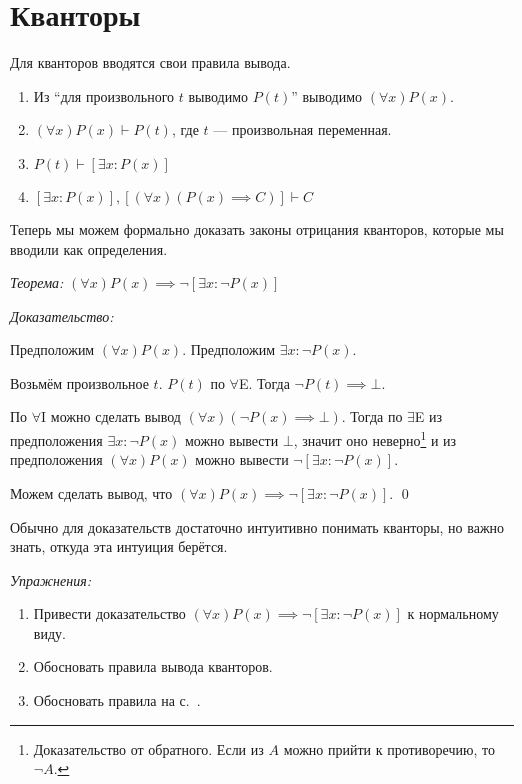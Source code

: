\section{Кванторы}

Для кванторов вводятся свои правила вывода.

\newcommand\Aii{$\forall$I}
\newcommand\Aee{$\forall$E}
\newcommand\Eii{$\exists$I}
\newcommand\Eee{$\exists$E}
\begin{enumerate}
	\item[(\Aii)]{}Из ``для произвольного $t$ выводимо $P(t)$''
	выводимо $(\forall x)P(x)$.
	\item[(\Aee)]{}$(\forall x)P(x)\vdash P(t)$, где $t$ --- произвольная переменная.
	\item[(\Eii)]{}$P(t)\vdash [\exists x:P(x)]$
	\item[(\Eee)]{}$[\exists x:P(x)], [(\forall x)(P(x)\implies C)]\vdash C$
\end{enumerate}

Теперь мы можем формально доказать законы отрицания кванторов,
которые мы вводили как определения.

\label{wordproof}
{\it Теорема:}
$(\forall x)P(x)\implies \lnot[\exists x:\lnot P(x)]$

{\it Доказательство:}

Предположим $(\forall x)P(x)$. Предположим $\exists x:\lnot P(x)$.

Возьмём произвольное $t$. $P(t)$ по \Aee. Тогда $\lnot P(t)\implies\bot$.

По \Aii{} можно сделать вывод $(\forall x)(\lnot P(x)\implies\bot)$.
Тогда по \Eee{} из предположения ${\exists x:\lnot P(x)}$ можно вывести $\bot$,
значит оно неверно\footnote{
	Доказательство от обратного. Если из $A$ можно прийти к противоречию, то $\lnot A$.
} и из предположения $(\forall x)P(x)$
можно вывести $\lnot[\exists x:\lnot P(x)]$.

Можем сделать вывод, что $(\forall x)P(x)\implies \lnot[\exists x:\lnot P(x)]$.
\qed

Обычно для доказательств достаточно интуитивно понимать кванторы,
но важно знать, откуда эта интуиция берётся.

{\it Упражнения:}

\begin{enumerate}
	\item{}Привести доказательство ${(\forall x)P(x)\implies \lnot[\exists x:\lnot P(x)]}$
	к нормальному виду.
	\item{}Обосновать правила вывода кванторов.
	\item{}Обосновать правила на с.~\pageref{deduction_rules}.
\end{enumerate}

